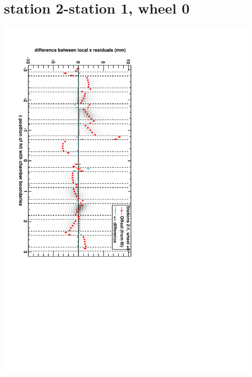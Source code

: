 \documentclass[compress]{beamer}
\begin{document}
\section*{station 2-station 1, wheel 0}
\begin{frame} \vfill \mbox{\hspace{-1 cm}\includegraphics[height=1.2\linewidth, angle=90]{DTrphidiff12VsPhi_whC_slope.pdf}} \end{frame}
\end{document}
